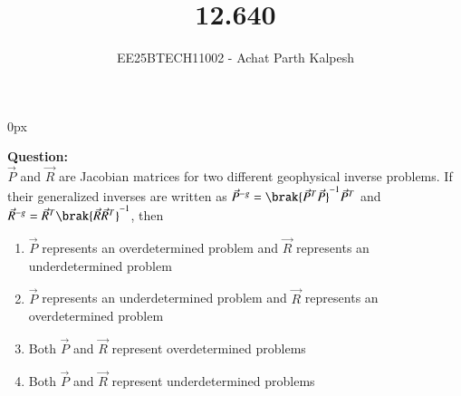 \documentclass[journal]{IEEEtran}
\begin{document}

\title{12.640}
\author{EE25BTECH11002 - Achat Parth Kalpesh }
{\let\newpage\relax\maketitle}
\renewcommand{\thefigure}{\theenumi}
\renewcommand{\thetable}{\theenumi}
\setlength{\intextsep}{10pt} %
\renewcommand{\thetable}{\theenumi}
\parindent 0px



\textbf{Question:}\\
$\vec{P}$ and $\vec{R}$ are Jacobian matrices for two different geophysical inverse problems. If their generalized inverses are written as $\vec{P}^{-g} = \brak{\vec{P}^T \vec{P}}^{-1} \vec{P}^T$ and $\vec{R}^{-g} = \vec{R}^T\brak{\vec{R} \vec{R}^T}^{-1}$, then
\begin{enumerate}
    \item $\vec{P}$ represents an overdetermined problem and $\vec{R}$ represents an underdetermined problem
    \item $\vec{P}$ represents an underdetermined problem and $\vec{R}$ represents an overdetermined problem
    \item Both $\vec{P}$ and $\vec{R}$ represent overdetermined problems
    \item Both $\vec{P}$ and $\vec{R}$ represent underdetermined problems
\end{enumerate}
\end{document}
